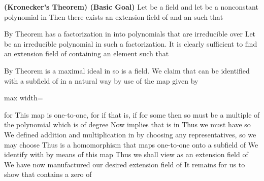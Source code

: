 \documentclass[11pt,oneside]{article}
\begin{document}
\BookNarrativetrue

\begin{BookBody}

 \textbf{(Kronecker’s Theorem) (Basic Goal)} Let  be a field and let  be a nonconstant polynomial in  Then there exists an extension field  of  and an  such that 

 By Theorem  has a factorization in  into polynomials that are irreducible over  Let  be an irreducible polynomial in such a factorization. It is clearly sufficient to find an extension field  of  containing an element \BookInline{\alpha } such that 

By Theorem  is a maximal ideal in  so  is a field. We claim that  can be identified with a subfield of  in a natural way by use of the map  given by

\begin{center}\begin{adjustbox}{max width=\linewidth}\end{adjustbox}\end{center}

\noindent for  This map is one-to-one, for if  that is, if  for some  then  so  must be a multiple of the polynomial  which is of degree  Now  implies that  is in  Thus we must have  so  We defined addition and multiplication in  by choosing any representatives, so we may choose  Thus \BookInline{\psi } is a homomorphism that maps  one-to-one onto a subfield of  We identify  with  by means of this map  Thus we shall view  as an extension field of  We have now manufactured our desired extension field  of  It remains for us to show that  contains a zero of 


\end{BookBody}
\end{document}
